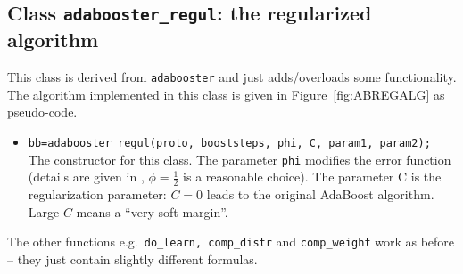\documentclass{article}
\begin{document}
\subsection{Class {\tt adabooster\_regul}: the regularized algorithm}
This class is derived from {\tt adabooster} and just adds/overloads some
functionality. The algorithm implemented in this class is given in
Figure~\ref{fig:ABREGALG} as pseudo-code.
\begin{itemize}
\item {\tt bb=adabooster\_regul(proto, booststeps, phi, C, param1, param2);}\\
  The constructor for this class. The parameter {\tt phi} modifies the error
  function (details are given in \cite{RaeOnoMue00a}, $\phi=\frac{1}{2}$ is a
  reasonable choice). The parameter C is the regularization parameter: $C=0$
  leads to the original AdaBoost algorithm. Large $C$ means a ``very soft
  margin''.
\end{itemize}
The other functions e.g.~{\tt do\_learn, comp\_distr} and {\tt comp\_weight} work
as before -- they just contain slightly different formulas.
\end{document}
